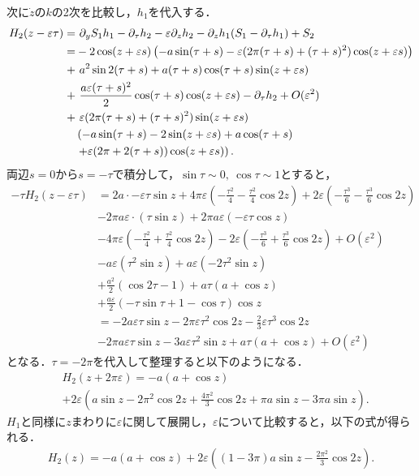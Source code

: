 \documentclass[../main]{subfiles}
\begin{document}
    次に$\dot{z}$の$k$の2次を比較し，$h_1$を代入する．
    \begin{align*}
        H_2(z-\varepsilon \tau)=&\ \partial_y S_1h_1 -\partial_\tau h_2-\varepsilon\partial_zh_2 -\partial_zh_1(S_1-\partial_\tau h_1)+S_2\\
        =&-2\cos (z+\varepsilon s)\left( -a\sin(\tau+s)-\varepsilon(2\pi (\tau+s)+(\tau+s)^2) \cos (z+\varepsilon s) \right)\\
        +&\ a^2\sin 2(\tau+s)+a(\tau+s)\cos (\tau+s)\sin (z+\varepsilon s)\\
        +&\ \frac{a\varepsilon (\tau+s)^2}{2}\cos (\tau+s) \cos (z+\varepsilon s)-\partial_\tau h_2+O(\varepsilon^2)\\
        +&\ \varepsilon(2\pi(\tau+s)+(\tau+s)^2)\sin (z+\varepsilon s) \\
        &\left( -a\sin(\tau+s)-2\sin (z+\varepsilon s) +a\cos(\tau+s)\right.\\
        &\left.+\varepsilon(2\pi +2(\tau+s))\cos (z+\varepsilon s)\right).
    \end{align*}
    両辺$s=0$から$s=-\tau$で積分して，$\sin\tau\sim 0,\ \cos\tau\sim 1$とすると，
    \begin{align*}
        -\tau H_2(z-\varepsilon \tau)&=2a\cdot -\varepsilon \tau\sin z+4\pi\varepsilon\left( -\frac{\tau^2}{4} -\frac{\tau^2}{4}\cos 2z\right)+2\varepsilon\left( -\frac{\tau^3}{6} -\frac{\tau^3}{6}\cos 2 z\right)\\
        &-2\pi a\varepsilon\cdot\left(\tau\sin z\right)+2\pi a\varepsilon\left(-\varepsilon \tau\cos z\right)\\
        &-4\pi\varepsilon\left(-\frac{\tau^2}{4}+\frac{\tau^2}{4}\cos 2 z\right)-2\varepsilon\left( -\frac{\tau^3}{6} +\frac{\tau^3}{6}\cos 2z\right)+O(\varepsilon^2)\\
        &-a\varepsilon\left( \tau^2\sin z \right)+a\varepsilon\left( -2\tau^2\sin z \right)\\
        &+\frac{a^2}{2}\left( \cos 2\tau-1\right)+a\tau(a+\cos z)\\
        &+\frac{a\varepsilon}{2}(-\tau\sin\tau+1-\cos\tau)\cos z\\
        &=-2a\varepsilon \tau\sin z-2\pi\varepsilon\tau^2\cos 2 z-\frac{2}{3}\varepsilon\tau^3\cos 2z\\
        &-2\pi a\varepsilon \tau\sin z-3a\varepsilon\tau^2\sin z+a\tau(a+\cos z)+O(\varepsilon^2)
    \end{align*}
    となる．$\tau=-2\pi$を代入して整理すると以下のようになる．
    \begin{align*}
        &H_2(z+2\pi\varepsilon )=-a(a+\cos z)\\
        &+2\varepsilon\left( a\sin z-2\pi^2\cos2 z+\frac{4\pi^2}{3} \cos 2 z+\pi a\sin z-3\pi a\sin z\right).
    \end{align*}
    $H_1$と同様に$z$まわりに$\varepsilon$に関して展開し，$\varepsilon$について比較すると，以下の式が得られる．
    \begin{align}
        \label{eq:nit-H2}
        H_2(z)=-a(a+\cos z)+2\varepsilon\left( (1-3\pi)a\sin z-\frac{2\pi^2}{3} \cos 2 z\right).
    \end{align}
\end{document}
